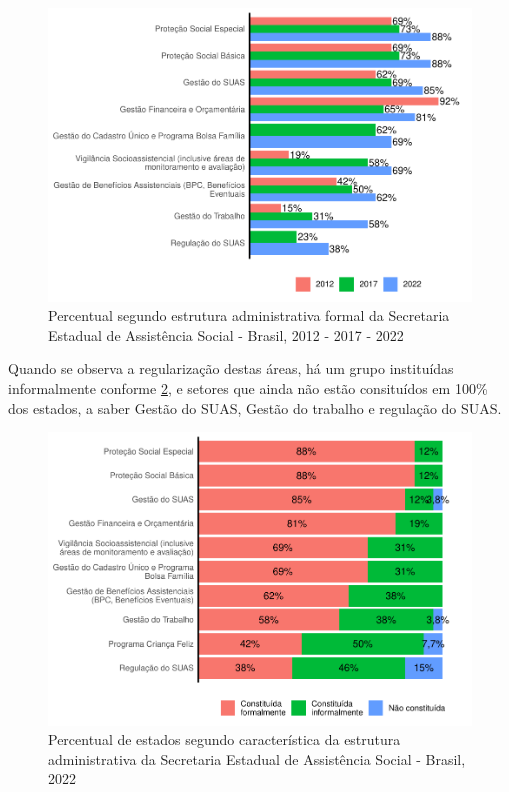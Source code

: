 \documentclass[
  brazilian]{report}
\begin{document}
\begin{figure}
\includegraphics{Censo-SUAS-2022_files/figure-latex/uf_subd-1} \caption[Percentual segundo estrutura administrativa formal da Secretaria Estadual de Assistência Social - Brasil, 2012 - 2017 - 2022]{Percentual segundo estrutura administrativa formal da Secretaria Estadual de Assistência Social - Brasil, 2012 - 2017 - 2022}\label{fig:uf_subd}
\end{figure}

Quando se observa a regularização destas áreas, há um grupo instituídas
informalmente conforme \cref{fig:estados-constituicao-subdivisoes}, e
setores que ainda não estão consituídos em 100\% dos estados, a saber
Gestão do SUAS, Gestão do trabalho e regulação do SUAS.

\begin{figure}
\includegraphics{Censo-SUAS-2022_files/figure-latex/estados-constituicao-subdivisoes-1} \caption[Percentual de estados segundo característica da estrutura administrativa da Secretaria Estadual de Assistência Social - Brasil,  2022]{Percentual de estados segundo característica da estrutura administrativa da Secretaria Estadual de Assistência Social - Brasil,  2022}\label{fig:estados-constituicao-subdivisoes}
\end{figure}
\end{document}
